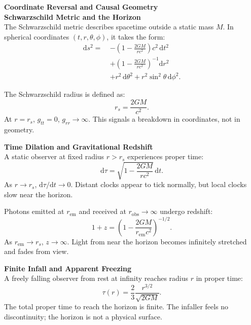 \begin{technical}
{\Large\textbf{Coordinate Reversal and Causal Geometry}}\\[0.1em]

\noindent\textbf{Schwarzschild Metric and the Horizon}\\[0.5em]
The Schwarzschild metric describes spacetime outside a static mass \(M\). In spherical coordinates \((t, r, \theta, \phi)\), it takes the form:
\begin{align}
\mathrm{d}s^2 =\ 
& -\left(1 - \frac{2GM}{rc^2}\right)c^2\,\mathrm{d}t^2 \nonumber \\
& + \left(1 - \frac{2GM}{rc^2}\right)^{-1}\mathrm{d}r^2 \nonumber \\
& + r^2\,\mathrm{d}\theta^2 + r^2\sin^2\theta\,\mathrm{d}\phi^2.
\end{align}

The Schwarzschild radius is defined as:
\[
r_s = \frac{2GM}{c^2}.
\]
At \(r = r_s\), \(g_{tt} = 0\), \(g_{rr} \to \infty\). This signals a breakdown in coordinates, not in geometry.

\vspace{0.3em}
\noindent\textbf{Time Dilation and Gravitational Redshift}\\[0.5em]
A static observer at fixed radius \(r > r_s\) experiences proper time:
\begin{equation}
\mathrm{d}\tau = \sqrt{1 - \frac{2GM}{rc^2}}\,\mathrm{d}t.
\end{equation}
As \(r \to r_s\), \(\mathrm{d}\tau/\mathrm{d}t \to 0\). Distant clocks appear to tick normally, but local clocks slow near the horizon.

Photons emitted at \(r_{\text{em}}\) and received at \(r_{\text{obs}} \to \infty\) undergo redshift:
\begin{equation}
1 + z = \left(1 - \frac{2GM}{r_{\text{em}}c^2}\right)^{-1/2}.
\end{equation}
As \(r_{\text{em}} \to r_s\), \(z \to \infty\). Light from near the horizon becomes infinitely stretched and fades from view.

\vspace{0.3em}
\noindent\textbf{Finite Infall and Apparent Freezing}\\[0.5em]
A freely falling observer from rest at infinity reaches radius \(r\) in proper time:
\begin{equation}
\tau(r) = \frac{2}{3}\frac{r^{3/2}}{\sqrt{2GM}}.
\end{equation}
The total proper time to reach the horizon is finite. The infaller feels no discontinuity; the horizon is not a physical surface.


\end{technical}
